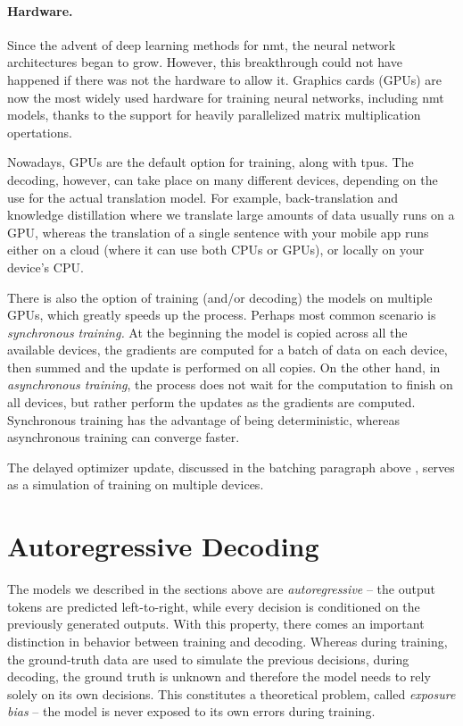 \paragraph{Hardware.} Since the advent of deep learning methods for \ac{nmt},
the neural network architectures began to grow. However, this breakthrough
could not have happened if there was not the hardware to allow it. Graphics
cards (GPUs) are now the most widely used hardware for training neural
networks, including \ac{nmt} models, thanks to the support for heavily
parallelized matrix multiplication opertations.

Nowadays, GPUs are the default option for training, along with \acp{tpu}. The
decoding, however, can take place on many different devices, depending on the
use for the actual translation model. For example, back-translation and
knowledge distillation where we translate large amounts of data usually runs on
a GPU, whereas the translation of a single sentence with your mobile app runs
either on a cloud (where it can use both CPUs or GPUs), or locally on your
device's CPU.

There is also the option of training (and/or decoding) the models on multiple
GPUs, which greatly speeds up the process. Perhaps most common scenario is
\emph{synchronous training.} At the beginning the model is copied across all
the available devices, the gradients are computed for a batch of data on each
device, then summed and the update is performed on all copies. On the other
hand, in \emph{asynchronous training}, the process does not wait for the
computation to finish on all devices, but rather perform the updates as the
gradients are computed. Synchronous training has the advantage of being
deterministic, whereas asynchronous training can converge faster. 

The delayed optimizer update, discussed in the batching paragraph above
, serves as a simulation of training on multiple devices.

\section{Autoregressive Decoding}
\label{sec:training-vs-inference}

The models we described in the sections above are \emph{autoregressive} -- the
output tokens are predicted left-to-right, while every decision is conditioned
on the previously generated outputs. With this property, there comes an
important distinction in behavior between training and decoding. Whereas during
training, the ground-truth data are used to simulate the previous decisions,
during decoding, the ground truth is unknown and therefore the model needs to
rely solely on its own decisions. This constitutes a theoretical problem,
called \emph{exposure bias} -- the model is never exposed to its own errors
during training.

